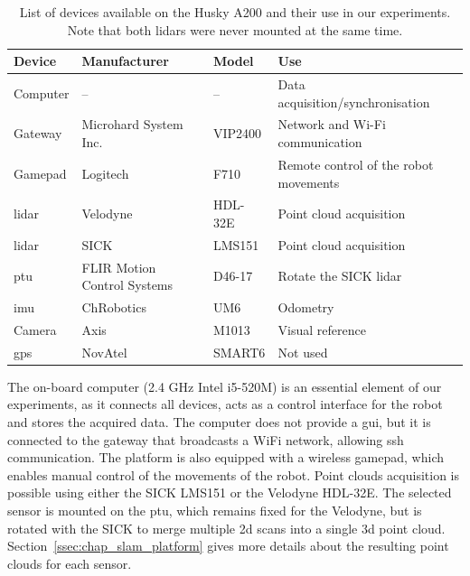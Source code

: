 \begin{table}[H]
    \centering
    \begin{tabular}{@{}llll@{}}
        \toprule
        \textbf{Device} & \textbf{Manufacturer}       & \textbf{Model}  & \textbf{Use}                          \\ \hline
        Computer        & --                          & --              & Data acquisition/synchronisation      \\
        Gateway         & Microhard System Inc.       & VIP2400         & Network and Wi-Fi communication       \\
        Gamepad         & Logitech                    & F710            & Remote control of the robot movements \\
        \gls*{lidar}    & Velodyne                    & HDL-32E         & Point cloud acquisition               \\
        \gls*{lidar}    & SICK                        & LMS151          & Point cloud acquisition               \\
        \gls*{ptu}      & FLIR Motion Control Systems & D46-17          & Rotate the SICK \gls*{lidar}          \\
        \gls*{imu}      & ChRobotics                  & UM6             & Odometry                              \\
        Camera          & Axis                        & M1013           & Visual reference                      \\
        \gls*{gps}      & NovAtel                     & SMART6          & Not used                              \\
        \bottomrule
    \end{tabular}
    \caption{List of devices available on the Husky A200 and their use in our experiments. Note that both \gls*{lidar}s were never mounted at the same time.}
    \label{tab:husky_devices}
\end{table}

The on-board computer (2.4 GHz Intel i5-520M) is an essential element of our experiments, as it connects all devices, acts as a control interface for the robot and stores the acquired data. The computer does not provide a \gls*{gui}, but it is connected to the gateway that broadcasts a WiFi network, allowing \gls*{ssh} communication. The platform is also equipped with a wireless gamepad, which enables manual control of the movements of the robot. Point clouds acquisition is possible using either the SICK LMS151 or the Velodyne HDL-32E. The selected sensor is mounted on the \gls*{ptu}, which remains fixed for the Velodyne, but is rotated with the SICK to merge multiple \gls*{2d} scans into a single \gls*{3d} point cloud. Section~\ref{ssec:chap_slam_platform} gives more details about the resulting point clouds for each sensor.

